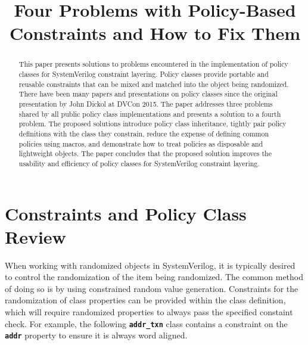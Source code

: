 \documentclass[conference,onecolumn]{IEEEtran}
\newcommand{\code}[1]{
\textbf{\texttt{#1}}
}
\begin{document}
\title{Four Problems with Policy-Based Constraints and How to Fix Them}

\author{
    \and
}

\maketitle

\begin{abstract}
    This paper presents solutions to problems encountered in the implementation of policy classes for SystemVerilog constraint layering. Policy classes provide portable and reusable constraints that can be mixed and matched into the object being randomized. There have been many papers and presentations on policy classes since the original presentation by John Dickol at DVCon 2015. The paper addresses three problems shared by all public policy class implementations and presents a solution to a fourth problem. The proposed solutions introduce policy class inheritance, tightly pair policy definitions with the class they constrain, reduce the expense of defining common policies using macros, and demonstrate how to treat policies as disposable and lightweight objects. The paper concludes that the proposed solution improves the usability and efficiency of policy classes for SystemVerilog constraint layering.
\end{abstract}

\section{Constraints and Policy Class Review}

When working with randomized objects in SystemVerilog, it is typically desired to control the randomization of the item being randomized. The common method of doing so is by using constrained random value generation. Constraints for the randomization of class properties can be provided within the class definition, which will require randomized properties to always pass the specified constaint check. For example, the following \code{addr_txn} class contains a constraint on the \code{addr} property to ensure it is always word aligned.
\end{document}
